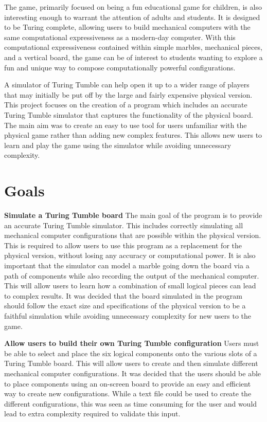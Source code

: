 \documentclass{l4proj}
\begin{document}
The game, primarily focused on being a fun educational game for children, is also interesting enough to warrant the attention of adults and students. It is designed to be Turing complete, allowing users to build mechanical computers with the same computational expressiveness as a modern-day computer. With this computational expressiveness contained within simple marbles, mechanical pieces, and a vertical board, the game can be of interest to students wanting to explore a fun and unique way to compose computationally powerful configurations.  

A simulator of Turing Tumble can help open it up to a wider range of players that may initially be put off by the large and fairly expensive physical version. This project focuses on the creation of a program which includes an accurate Turing Tumble simulator that captures the functionality of the physical board. The main aim was to create an easy to use tool for users unfamiliar with the physical game rather than adding new complex features. This allows new users to learn and play the game using the simulator while avoiding unnecessary complexity. 


\section{Goals}
\textbf{Simulate a Turing Tumble board} The main goal of the program is to provide an accurate Turing Tumble simulator. This includes correctly simulating all mechanical computer configurations that are possible within the physical version. This is required to allow users to use this program as a replacement for the physical version, without losing any accuracy or computational power. It is also important that the simulator can model a marble going down the board via a path of components while also recording the output of the mechanical computer. This will allow users to learn how a combination of small logical pieces can lead to complex results. It was decided that the board simulated in the program should follow the exact size and specifications of the physical version to be a faithful simulation while avoiding unnecessary complexity for new users to the game.

\textbf{Allow users to build their own Turing Tumble configuration} Users must be able to select and place the six logical components onto the various slots of a Turing Tumble board. This will allow users to create and then simulate different mechanical computer configurations. It was decided that the users should be able to place components using an on-screen board to provide an easy and efficient way to create new configurations. While a text file could be used to create the different configurations, this was seen as time consuming for the user and would lead to extra complexity required to validate this input.  
\end{document}
